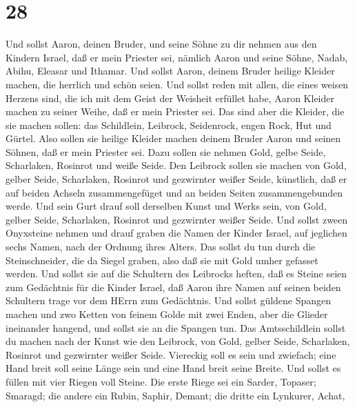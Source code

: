 \hypertarget{section-27}{%
\section{28}\label{section-27}}

 Und sollst Aaron, deinen Bruder, und seine Söhne zu dir
nehmen aus den Kindern Israel, daß er mein Priester sei, nämlich Aaron
und seine Söhne, Nadab, Abihu, Eleasar und Ithamar.  Und
sollst Aaron, deinem Bruder heilige Kleider machen, die herrlich und
schön seien.  Und sollst reden mit allen, die eines weisen
Herzens sind, die ich mit dem Geist der Weisheit erfüllet habe, Aaron
Kleider machen zu seiner Weihe, daß er mein Priester sei. 
Das sind aber die Kleider, die sie machen sollen: das Schildlein,
Leibrock, Seidenrock, engen Rock, Hut und Gürtel. Also sollen sie
heilige Kleider machen deinem Bruder Aaron und seinen Söhnen, daß er
mein Priester sei.  Dazu sollen sie nehmen Gold, gelbe
Seide, Scharlaken, Rosinrot und weiße Seide.  Den Leibrock
sollen sie machen von Gold, gelber Seide, Scharlaken, Rosinrot und
gezwirnter weißer Seide, künstlich,  daß er auf beiden
Achseln zusammengefüget und an beiden Seiten zusammengebunden werde.
 Und sein Gurt drauf soll derselben Kunst und Werks sein,
von Gold, gelber Seide, Scharlaken, Rosinrot und gezwirnter weißer
Seide.  Und sollst zween Onyxsteine nehmen und drauf graben
die Namen der Kinder Israel,  auf jeglichen sechs Namen,
nach der Ordnung ihres Alters.  Das sollst du tun durch die
Steinschneider, die da Siegel graben, also daß sie mit Gold umher
gefasset werden.  Und sollst sie auf die Schultern des
Leibrocks heften, daß es Steine seien zum Gedächtnis für die Kinder
Israel, daß Aaron ihre Namen auf seinen beiden Schultern trage vor dem
HErrn zum Gedächtnis.  Und sollst güldene Spangen machen
 und zwo Ketten von feinem Golde mit zwei Enden, aber die
Glieder ineinander hangend, und sollst sie an die Spangen tun.
 Das Amtsschildlein sollst du machen nach der Kunst wie den
Leibrock, von Gold, gelber Seide, Scharlaken, Rosinrot und gezwirnter
weißer Seide.  Viereckig soll es sein und zwiefach; eine
Hand breit soll seine Länge sein und eine Hand breit seine Breite.
 Und sollst es füllen mit vier Riegen voll Steine. Die
erste Riege sei ein Sarder, Topaser; Smaragd;  die andere
ein Rubin, Saphir, Demant;  die dritte ein Lynkurer, Achat,
